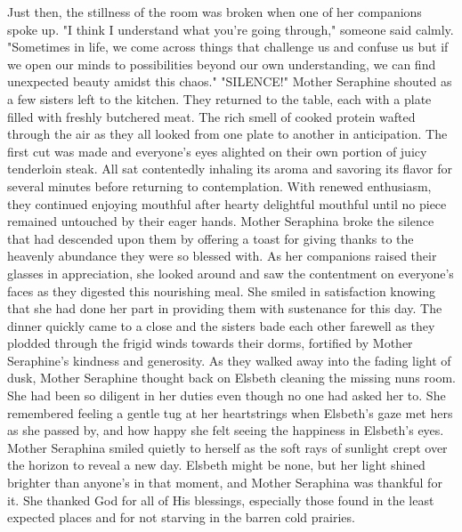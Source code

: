 \documentclass[11pt]{article}
\begin{document}
Just then, the stillness of the room was broken when one of her companions spoke up.
  "I think I understand what you're going through," someone said calmly. "Sometimes in life, we come across things that challenge us and confuse us but if we open our minds to possibilities beyond our own understanding, we can find unexpected beauty amidst this chaos."
  "SILENCE!" Mother Seraphine shouted as a few sisters left to the kitchen. They returned to the table, each with a plate filled with freshly butchered meat. The rich smell of cooked protein wafted through the air as they all looked from one plate to another in anticipation. The first cut was made and everyone's eyes alighted on their own portion of juicy tenderloin steak. All sat contentedly inhaling its aroma and savoring its flavor for several minutes before returning to contemplation. With renewed enthusiasm, they continued enjoying mouthful after hearty delightful mouthful until no piece remained untouched by their eager hands.
  Mother Seraphina broke the silence that had descended upon them by offering a toast for giving thanks to the heavenly abundance they were so blessed with. As her companions raised their glasses in appreciation, she looked around and saw the contentment on everyone's faces as they digested this nourishing meal. She smiled in satisfaction knowing that she had done her part in providing them with sustenance for this day.
  The dinner quickly came to a close and the sisters bade each other farewell as they plodded through the frigid winds towards their dorms, fortified by Mother Seraphine's kindness and generosity. As they walked away into the fading light of dusk, Mother Seraphine thought back on Elsbeth cleaning the missing nuns room. She had been so diligent in her duties even though no one had asked her to. She remembered feeling a gentle tug at her heartstrings when Elsbeth's gaze met hers as she passed by, and how happy she felt seeing the happiness in Elsbeth's eyes.
  Mother Seraphina smiled quietly to herself as the soft rays of sunlight crept over the horizon to reveal a new day. Elsbeth might be none, but her light shined brighter than anyone's in that moment, and Mother Seraphina was thankful for it. She thanked God for all of His blessings, especially those found in the least expected places and for not starving in the barren cold prairies.
\end{document}
